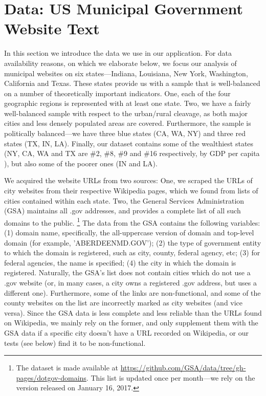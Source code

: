 \documentclass[11pt]{article}
\begin{document}
\section{Data: US Municipal Government Website Text}

In this section we introduce the data we use in our application. For data availability reasons, on which we elaborate below, we focus our analysis of municipal websites on six states---Indiana, Louisiana, New York, Washington, California and Texas. These states provide us with a sample that is well-balanced on a number of theoretically important indicators. One, each of the four geographic regions is represented with at least one state. Two, we have a fairly well-balanced sample with respect to the urban/rural cleavage, as both major cities and less densely populated areas are covered. Furthermore, the sample is politically balanced---we have three blue states (CA, WA, NY) and three red states (TX, IN, LA). Finally, our dataset contains some of the wealthiest states (NY, CA, WA and TX are \#2, \#8, \#9 and \#16 respectively, by GDP per capita \citep{BureauofEconomicAnalysis2017}), but also some of the poorer ones (IN and LA). 

We acquired the website URLs from two sources: One, we scraped the URLs of city websites from their respective Wikipedia pages, which we found from lists of cities contained within each state. Two, the General Services Administration (GSA) maintains all .gov addresses, and provides a complete list of all such domains to the public. \footnote{ The dataset is made available at \url{https://github.com/GSA/data/tree/gh-pages/dotgov-domains}. This list is updated once per month---we rely on the version released on January 16, 2017.} The data from the GSA contains the following variables: (1) domain name, specifically, the all-uppercase version of domain and top-level domain (for example, 'ABERDEENMD.GOV'); (2) the type of government entity to which the domain is registered, such as city, county, federal agency, etc; (3) for federal agencies, the name is specified; (4) the city in which the domain is registered. Naturally, the GSA's list does not contain cities which do not use a .gov website (or, in many cases, a city owns a registered .gov address, but uses a different one). Furthermore, some of the links are non-functional, and some of the county websites on the list are incorrectly marked as city websites (and vice versa). Since the GSA data is less complete and less reliable than the URLs found on Wikipedia, we mainly rely on the former, and only supplement them with the GSA data if a specific city doesn't have a URL recorded on Wikipedia, or our tests (see below) find it to be non-functional.
\end{document}
